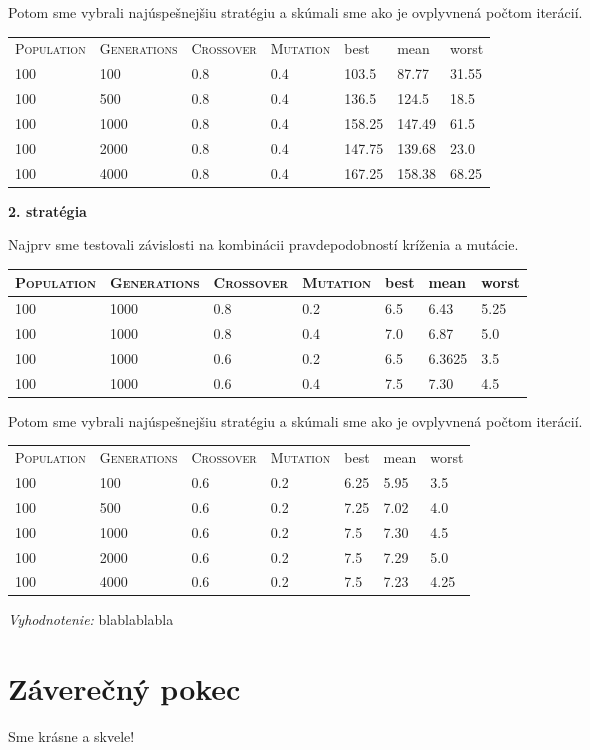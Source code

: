 \documentclass[10pt]{paper}
\begin{document}
Potom sme vybrali najúspešnejšiu stratégiu a skúmali sme ako je ovplyvnená počtom iterácií.

\begin{center}
\begin{tabular}{|llll|lll|}
\hline
\textsc{Population} & \textsc{Generations} & \textsc{Crossover} & \textsc{Mutation}  & best & mean & worst \\
 
100 & 100 & 0.8 & 0.4 & 103.5 & 87.77 & 31.55 \\
100 & 500 & 0.8 & 0.4 & 136.5 & 124.5 & 18.5\\
100 & 1000 & 0.8 & 0.4 & 158.25 & 147.49 & 61.5\\ 
100 & 2000 & 0.8 & 0.4 & 147.75 & 139.68 & 23.0\\
100 & 4000 & 0.8 & 0.4 & 167.25 & 158.38 & 68.25\\ \hline

\end{tabular}
\end{center}

\textbf{2. stratégia}

Najprv sme testovali závislosti na kombinácii pravdepodobností kríženia a mutácie.\\
\begin{center}
\begin{tabular}{|llll|lll|}
\hline
\textsc{Population} & \textsc{Generations} & \textsc{Crossover} & \textsc{Mutation}  & best & mean & worst \\ \hline

100 & 1000 & 0.8 & 0.2 & 6.5 & 6.43 & 5.25\\ 
100 & 1000 & 0.8 & 0.4 & 7.0 & 6.87 & 5.0\\
100 & 1000 & 0.6 & 0.2 & 6.5 & 6.3625 & 3.5\\
100 & 1000 & 0.6 & 0.4 & 7.5 & 7.30 & 4.5\\ \hline
\end{tabular}
\end{center}

Potom sme vybrali najúspešnejšiu stratégiu a skúmali sme ako je ovplyvnená počtom iterácií.

\begin{center}
\begin{tabular}{|llll|lll|}
\hline
\textsc{Population} & \textsc{Generations} & \textsc{Crossover} & \textsc{Mutation}  & best & mean & worst \\
100 & 100 & 0.6 & 0.2 & 6.25 & 5.95 & 3.5 \\
100 & 500 & 0.6 & 0.2 & 7.25 & 7.02 & 4.0\\
100 & 1000 & 0.6 & 0.2 & 7.5 & 7.30 & 4.5\\ 
100 & 2000 & 0.6 & 0.2 & 7.5 & 7.29 & 5.0\\
100 & 4000 & 0.6 & 0.2 & 7.5 & 7.23 & 4.25\\ \hline
\end{tabular}
\end{center}

\textit{Vyhodnotenie:} blablablabla

\section{Záverečný pokec}

Sme krásne a skvele!
\end{document}
